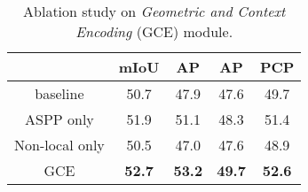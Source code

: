 \documentclass[10pt,twocolumn,letterpaper]{article}
\begin{document}
\begin{table}[t]
\centering
\small
\begin{tabular}{c|cccc}
& mIoU  &  AP & AP  & PCP \\
 \toprule[0.2em]
baseline           & 50.7 & 47.9 & 47.6 & 49.7 \\
ASPP only        & 51.9 & 51.1 & 48.3 & 51.4 \\
Non-local only  & 50.5 & 47.0 & 47.6 & 48.9 \\
GCE                 & \textbf{52.7} & \textbf{53.2} & \textbf{49.7} & \textbf{52.6} \\

\end{tabular}
\vspace{.5em}
  \caption{Ablation study on \emph{Geometric and Context Encoding} (GCE) module.}
  \label{tab:ablation_gce}
\vspace{-.8em}
\end{table}



\begin{table}[t]
\centering
\small
{}
\vspace{.5em}
  \caption{Ablation study on \emph{Parsing Branch Decoupling} (PBD) structure. 4conv denotes four convolutional layers with 33 kernels.}
  \label{tab:ablation_pbd}
\vspace{-.8em}
\end{table}
\end{document}
